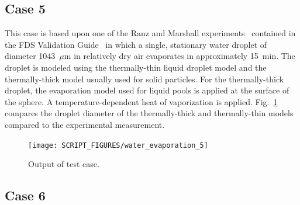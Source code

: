 \documentclass[11pt]{book}
\begin{document}
\subsection{Case 5}
\label{water_evaporation_5}

This case is based upon one of the Ranz and Marshall experiments~\cite{Ranz} contained in the FDS Validation Guide~\cite{FDS_Validation_Guide} in which a single, stationary water droplet of diameter 1043~$\mu$m in relatively dry air evaporates in approximately 15~min. The droplet is modeled using the thermally-thin liquid droplet model and the thermally-thick model usually used for solid particles. For the thermally-thick droplet, the evaporation model used for liquid pools is applied at the surface of the sphere. A temperature-dependent heat of vaporization is applied. Fig.~\ref{water_evaporation_5_plot} compares the droplet diameter of the thermally-thick and thermally-thin models compared to the experimental measurement.

\begin{figure}[h!]
\centering
\texttt{[image: SCRIPT\_FIGURES/water\_evaporation\_5]}
\caption[Sample case ]{Output of  test case.}
\label{water_evaporation_5_plot}
\end{figure}

\subsection{Case 6}
\label{water_evaporation_6}
\end{document}
